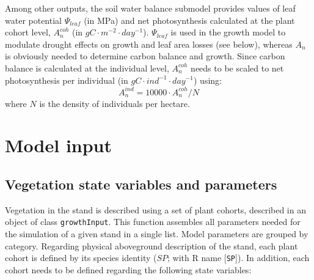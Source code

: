 \documentclass[]{book}
\begin{document}
Among other outputs, the soil water balance submodel provides values of leaf water potential \(\Psi_{leaf}\) (in MPa) and net photosynthesis calculated at the plant cohort level, \(A_n^{coh}\) (in \(g C · m^{-2} · day^{-1}\)). \(\Psi_{leaf}\) is used in the growth model to modulate drought effects on growth and leaf area losses (see below), whereas \(A_n\) is obviously needed to determine carbon balance and growth. Since carbon balance is calculated at the individual level, \(A_n^{coh}\) needs to be scaled to net photosynthesis per individual (in \(g C · ind^{-1} · day^{-1}\)) using:
\begin{equation}
A_{n}^{ind} = 10000 \cdot A_n^{coh} / N
\end{equation}
where \(N\) is the density of individuals per hectare.

\hypertarget{model-input-2}{%
\section{Model input}\label{model-input-2}}

\hypertarget{vegetation-state-variables-and-parameters}{%
\subsection{Vegetation state variables and parameters}\label{vegetation-state-variables-and-parameters}}

Vegetation in the stand is described using a set of plant cohorts, described in an object of class \texttt{growthInput}. This function assembles all parameters needed for the simulation of a given stand in a single list. Model parameters are grouped by category. Regarding physical aboveground description of the stand, each plant cohort is defined by its species identity (\(SP\); with R name {[}\texttt{SP}{]}). In addition, each cohort needs to be defined regarding the following state variables:
\end{document}
